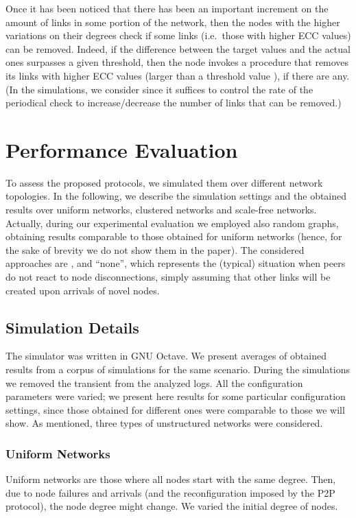\documentclass[10pt, conference, compsocconf]{IEEEtran}
\begin{document}
Once it has been noticed that there has been an important increment on the amount of links in some portion of the network, then the nodes with the higher variations on their degrees check if some links (i.e.~those with higher ECC values) can be removed.
Indeed, if the difference between the target values and the actual ones surpasses a given threshold, then the node  invokes a procedure that removes its  links with higher ECC values (larger than a threshold value ), if there are any. (In the simulations, we consider  since it suffices to control the rate of the periodical check to increase/decrease the number of links that can be removed.)




\section{Performance Evaluation}\label{sec:eval}

To assess the proposed protocols, we simulated them over different network topologies. In the following, we describe the simulation settings and the obtained results over uniform networks, clustered networks and scale-free networks. 
Actually, during our experimental evaluation we employed also random graphs, obtaining results comparable to those obtained for uniform networks (hence, for the sake of brevity we do not show them in the paper).
The considered approaches are ,  and ``none'', which represents the (typical) situation when peers do not react to node disconnections, simply assuming that other links will be created upon arrivals of novel nodes.

\subsection{Simulation Details}

The simulator was written in GNU Octave.
We present averages of obtained results from a corpus of  simulations for the same scenario. During the simulations we removed the transient from the analyzed logs. All the configuration parameters were varied; we present here results for some particular configuration settings, since those obtained for different ones were comparable to those we will show.
As mentioned, three types of unstructured networks were considered. 

\subsubsection{Uniform Networks}
Uniform networks are those where all nodes start with the same degree. Then, due to node failures and arrivals (and the reconfiguration imposed by the P2P protocol), the node degree might change.
We varied the initial degree of nodes. 
\end{document}
